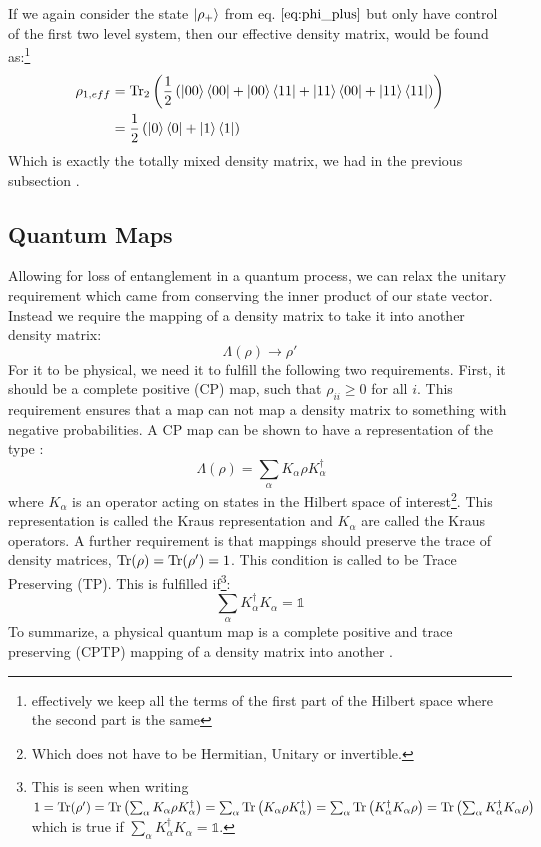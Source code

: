 If we again consider the state $\ket{\rho_+}$ from eq. $\ref{eq:phi_plus}$ but only have control of the first two level system, then our effective density matrix, would be found as:\footnote{effectively we keep all the terms of the first part of the Hilbert space where the second part is the same}
\begin{align}
    \rho_{1, eff}   &= \Tr_2 \left(\frac12 \left(\ket{00}\bra{00} + \ket{00}\bra{11} + \ket{11}\bra{00} + \ket{11}\bra{11} \right) \right) \\
                    &= \frac12 \left(\ket{0}\bra{0} + \ket{1}\bra{1} \right)
\end{align}
Which is exactly the totally mixed density matrix, we had in the previous subsection \cite{manzano_short_2020}. 
 
\subsection{Quantum Maps}
Allowing for loss of entanglement in a quantum process, we can relax the unitary requirement which came from conserving the inner product of our state vector. Instead we require the mapping of a density matrix to take it into another density matrix:
\begin{equation}
    \Lambda(\rho) \to \rho'
\end{equation}
For it to be physical, we need it to fulfill the following two requirements. First, it should be a complete positive (CP) map, such that $\rho_{ii} \geq 0$ for all $i$. This requirement ensures that a map can not map a density matrix to something with negative probabilities. A CP map can be shown to have a representation of the type \cite{greenbaum_introduction_2015}:
\begin{equation}\
    \Lambda(\rho) = \sum_\alpha K_\alpha\rho K_\alpha^\dagger
\end{equation}
where $K_\alpha$ is an operator acting on states in the Hilbert space of interest\footnote{Which does not have to be Hermitian, Unitary or invertible.}. This representation is called the Kraus representation and $K_\alpha$ are called the Kraus operators. A further requirement is that mappings should preserve the trace of density matrices, $\Tr
(\rho) = \Tr(\rho') = 1$. This condition is called to be Trace Preserving (TP). This is fulfilled if\footnote{This is seen when writing $1 = \Tr(\rho') = \Tr\left(\sum_\alpha K_\alpha\rho K_\alpha^\dagger \right) = \sum_\alpha\Tr\left(K_\alpha\rho K_\alpha^\dagger \right)= \sum_\alpha\Tr\left(K_\alpha^\dagger K_\alpha\rho  \right) = \Tr\left(\sum_\alpha K_\alpha^\dagger K_\alpha\rho  \right)$ which is true if $\sum_\alpha K_\alpha^\dagger K_\alpha = \mathbb{1}$.}:
\begin{equation}
    \sum_\alpha K_\alpha^\dagger K_\alpha = \mathbb{1}
\end{equation}
To summarize, a physical quantum map is a complete positive and trace preserving (CPTP) mapping of a density matrix into another \cite{greenbaum_introduction_2015}.

